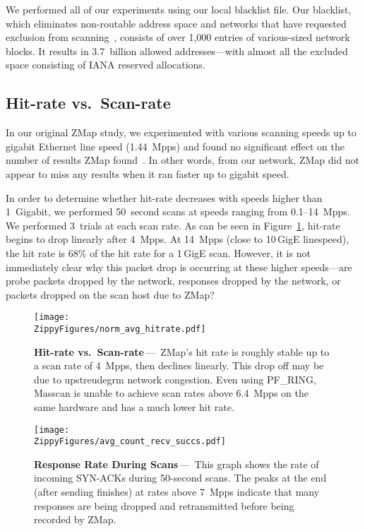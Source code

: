 We performed all of our experiments using our local blacklist file. Our
blacklist, which eliminates non-routable address space and networks that have
requested exclusion from scanning~\cite{state-of-scanning-2014}, consists of over
1,000 entries of various-sized network blocks. It results in 3.7~billion
allowed addresses---with almost all the excluded space consisting of IANA
reserved allocations.

\subsection{Hit-rate vs.\ Scan-rate}

In our original ZMap study, we experimented with various scanning speeds up
to gigabit Ethernet line speed (1.44~Mpps) and found no significant effect on
the number of results ZMap found~\cite{zmap-2013}. In other words, from our
network, ZMap did not appear to miss any results when it ran faster up to
gigabit speed.

In order to determine whether hit-rate decreases with speeds higher than
1~Gigabit, we performed 50~second scans at speeds ranging from 0.1--14~Mpps.
We performed 3~trials at each scan rate. As can be seen in
Figure~\ref{fig:hitrate}, hit-rate begins to drop linearly after 4~Mpps. At
14~Mpps (close to 10\,GigE linespeed), the hit rate is 68\% of the hit rate
for a 1\,GigE scan. However, it is not immediately clear why this packet drop
is occurring at these higher speeds---are probe packets dropped by the
network, responses dropped by the network, or packets dropped on the scan
host due to ZMap?

\begin{figure}[t]\centering
\texttt{[image: \\ZippyFigures/norm\_avg\_hitrate.pdf]}
\caption{\textbf{Hit-rate vs.\ Scan-rate}\,---\,%
ZMap's hit rate is roughly stable up to a scan rate of 4~Mpps, then declines
linearly. This drop off may be due to upstreudegrm network congestion. Even using
PF\_RING, Masscan is unable to achieve scan rates above 6.4~Mpps on the same
hardware and has a much lower hit rate.}
\label{fig:hitrate}
\end{figure}

\begin{figure}[t]\centering
\texttt{[image: \\ZippyFigures/avg\_count\_recv\_succs.pdf]}
\caption{\textbf{Response Rate During Scans}\,---\,%
This graph shows the rate of incoming SYN-ACKs during 50-second scans. The
peaks at the end (after sending finishes) at rates above 7~Mpps indicate that
many responses are being dropped and retransmitted before being recorded by
ZMap.}
\label{fig:recvrate}
\end{figure}

